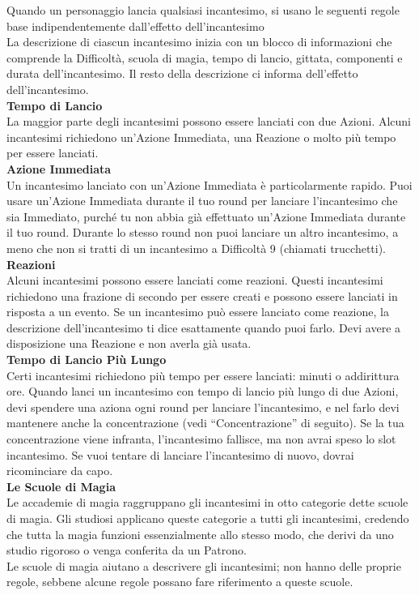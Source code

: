 Quando un personaggio lancia qualsiasi incantesimo, si  usano le seguenti regole base indipendentemente dall'effetto dell'incantesimo\\
La descrizione di ciascun incantesimo inizia con un  blocco di informazioni che comprende la Difficoltà, scuola di magia, tempo di lancio, gittata, componenti e durata dell'incantesimo. Il resto della descrizione ci informa  dell'effetto dell'incantesimo. \\

\textbf{Tempo di Lancio}\\
La maggior parte degli incantesimi possono essere  lanciati con due Azioni. Alcuni incantesimi  richiedono un'Azione Immediata, una Reazione o molto più  tempo per essere lanciati.\\

\textbf{Azione Immediata}\\
Un incantesimo lanciato con un'Azione Immediata è particolarmente rapido. Puoi usare un'Azione Immediata  durante il tuo round per lanciare l'incantesimo che sia Immediato, purché tu  non abbia già effettuato un'Azione Immediata durante il tuo  round. Durante lo stesso round non puoi lanciare un altro  incantesimo, a meno che non si tratti di un incantesimo a Difficoltà 9 (chiamati trucchetti). \\

\textbf{Reazioni}\\
Alcuni incantesimi possono essere lanciati come reazioni. Questi incantesimi richiedono una frazione di secondo per essere creati e possono essere lanciati in risposta a un evento. Se un incantesimo può essere  lanciato come reazione, la descrizione dell'incantesimo  ti dice esattamente quando puoi farlo. Devi avere a disposizione una Reazione e non averla già usata.\\

\textbf{Tempo di Lancio Più Lungo}\\
Certi incantesimi richiedono più tempo per essere lanciati: minuti o  addirittura ore. Quando lanci un incantesimo con tempo  di lancio più lungo di due Azioni,  devi spendere una aziona ogni round per lanciare  l'incantesimo, e nel farlo devi mantenere anche la  concentrazione (vedi “Concentrazione” di seguito). Se  la tua concentrazione viene infranta, l'incantesimo  fallisce, ma non avrai speso lo slot incantesimo. Se vuoi tentare di lanciare l'incantesimo di nuovo, dovrai ricominciare da capo.\\

\textbf{Le Scuole di Magia}\\
Le accademie di magia raggruppano gli incantesimi in otto  categorie dette scuole di magia. Gli studiosi applicano queste categorie a tutti gli incantesimi,  credendo che tutta la magia funzioni essenzialmente allo stesso  modo, che derivi da uno studio rigoroso o venga conferita da un Patrono.\\
Le scuole di magia aiutano a descrivere gli incantesimi; non  hanno delle proprie regole, sebbene alcune regole possano fare riferimento a queste scuole.\\

